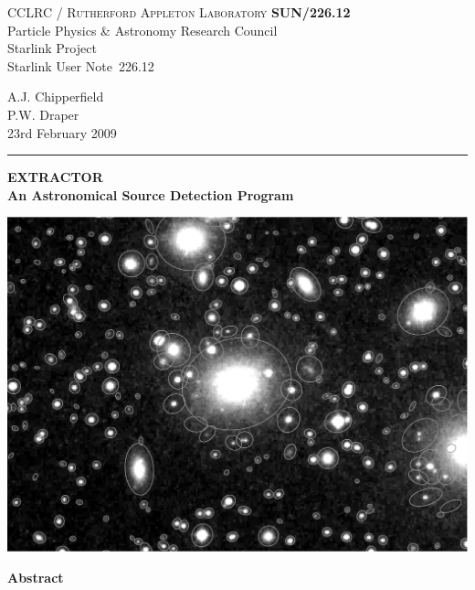 \documentclass[twoside,11pt]{article}
\newcommand{\stardoccategory}  {Starlink User Note}
\newcommand{\stardocinitials}  {SUN}
\newcommand{\stardocnumber}    {226.12}
\newcommand{\stardocauthors}   {A.J. Chipperfield\\
                                P.W. Draper}
\newcommand{\stardocdate}      {23rd February 2009}
\newcommand{\stardoctitle}     {EXTRACTOR\\
                                An Astronomical Source Detection Program}
\newcommand{\stardocname}{\stardocinitials /\stardocnumber}
\newenvironment{latexonly}{}{}
\renewcommand{\_}{\texttt{\symbol{95}}}
\begin{document}
\thispagestyle{empty}

\begin{latexonly}
   CCLRC / \textsc{Rutherford Appleton Laboratory} \hfill \textbf{\stardocname}\\
   {\large Particle Physics \& Astronomy Research Council}\\
   {\large Starlink Project\\}
   {\large \stardoccategory\ \stardocnumber}
   \begin{flushright}
   \stardocauthors\\
   \stardocdate
   \end{flushright}
   \vspace{-4mm}
   \rule{\textwidth}{0.5mm}
   \vspace{4mm}
   \begin{center}
   {\LARGE\textbf{\stardoctitle} \\ [2.5ex]}
   \vspace{4mm}

   \includegraphics[scale=0.6]{sun226_fig}
   \end{center}

   \vspace{5mm}
   \begin{center}
      {\Large\textbf{Abstract}}
   \end{center}
\end{latexonly}
\end{document}
